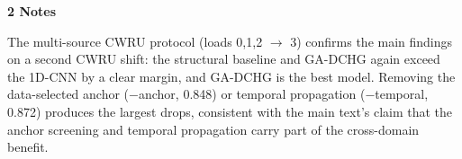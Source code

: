 \documentclass[10pt]{article}
\begin{document}
\vspace{0.5em}

\noindent\textbf{2 Notes}

The multi-source CWRU protocol (loads 0,1,2 $\to$ 3) confirms the main findings on a second CWRU shift: the structural baseline and GA-DCHG again exceed the 1D-CNN by a clear margin, and GA-DCHG is the best model. Removing the data-selected anchor ($-$anchor, 0.848) or temporal propagation ($-$temporal, 0.872) produces the largest drops, consistent with the main text's claim that the anchor screening and temporal propagation carry part of the cross-domain benefit.
\end{document}
